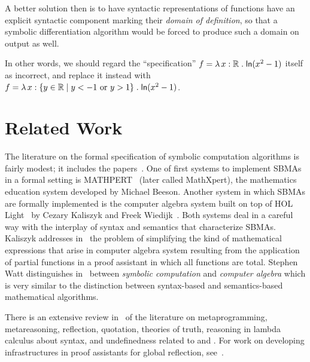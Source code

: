 \documentclass[fleqn]{llncs}
\newcommand{\RR}{\ensuremath{\mathbb{R}}}
\begin{document}
A better solution then is to have syntactic representations of functions have
an explicit syntactic component marking their \emph{domain of definition},
so that a symbolic differentiation algorithm would be forced to produce
such a domain on output as well.

In other words, we should regard the ``specification''
$f = \LambdaApp x : \RR \mdot \mname{ln}(x^2 - 1)$ itself as incorrect,
and replace it instead with
$f = \LambdaApp x : \set{y \in \RR \mid y < -1 \text{ or } y > 1}
\mdot \mname{ln}(x^2 - 1)$.

\section{Related Work}\label{sec:related-work}

The literature on the formal specification of symbolic computation
algorithms is fairly modest; it includes the
papers~\cite{DunstanEtAl98,Khan14,KhanSchreiner12,LimongelliTemperini92}.
One of first systems to implement SBMAs in a formal setting is
MATHPERT~\cite{Beeson89} (later called MathXpert), the mathematics
education system developed by Michael Beeson.  Another system in which
SBMAs are formally implemented is the computer algebra system built on
top of HOL Light~\cite{Harrison09} by Cezary Kaliszyk and Freek
Wiedijk~\cite{KaliszykWiedijk07}.  Both systems deal in a careful way
with the interplay of syntax and semantics that characterize SBMAs.
Kaliszyk addresses in~\cite{Kaliszyk08} the problem of simplifying the
kind of mathematical expressions that arise in computer algebra system
resulting from the application of partial functions in a proof
assistant in which all functions are total.  Stephen Watt
distinguishes in~\cite{Watt06} between \emph{symbolic computation} and
\emph{computer algebra} which is very similar to the distinction
between syntax-based and semantics-based mathematical algorithms.

\bsp There is an extensive review in~\cite{Farmer18} of the literature
on metaprogramming, metareasoning, reflection, quotation, theories of
truth, reasoning in lambda calculus about syntax, and undefinedness
related to {\churchqe} and {\churchuqe}.  For work on developing
infrastructures in proof assistants for global reflection,
see~\cite{AnandEtAl18,BoyerMoore81,BuchbergerEtAl06,Christiansen:2014,ebner2017metaprogramming,MelhamEtAl13,VanDerWaltSwierstra12}.
\esp

\iffalse
\end{document}
